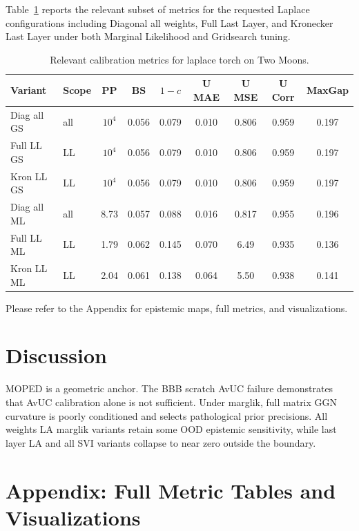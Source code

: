 \documentclass[conference]{IEEEtran}
\begin{document}
Table~\ref{tab:la_main_subset} reports the relevant subset of metrics for the requested Laplace configurations including Diagonal all weights, Full Last Layer, and Kronecker Last Layer under both Marginal Likelihood and Gridsearch tuning.

\begin{table}[H]
	\centering
	\caption{Relevant calibration metrics for laplace torch on Two Moons.}
	\label{tab:la_main_subset}
	\small\setlength{\tabcolsep}{4pt}
	\begin{tabular}{llccccccc}
		\toprule
		Variant     & Scope & PP     & BS    & $1 - c$ & U MAE & U MSE & U Corr & MaxGap \\
		\midrule
		Diag all GS & all   & $10^4$ & 0.056 & 0.079   & 0.010 & 0.806 & 0.959  & 0.197  \\
		Full LL GS  & LL    & $10^4$ & 0.056 & 0.079   & 0.010 & 0.806 & 0.959  & 0.197  \\
		Kron LL GS  & LL    & $10^4$ & 0.056 & 0.079   & 0.010 & 0.806 & 0.959  & 0.197  \\
		Diag all ML & all   & 8.73   & 0.057 & 0.088   & 0.016 & 0.817 & 0.955  & 0.196  \\
		Full LL ML  & LL    & 1.79   & 0.062 & 0.145   & 0.070 & 6.49  & 0.935  & 0.136  \\
		Kron LL ML  & LL    & 2.04   & 0.061 & 0.138   & 0.064 & 5.50  & 0.938  & 0.141  \\
		\bottomrule
	\end{tabular}
\end{table}

Please refer to the Appendix for epistemic maps, full metrics, and visualizations.

\section{Discussion}
\label{sec:discussion}

MOPED is a geometric anchor. The BBB scratch AvUC failure demonstrates that AvUC calibration alone is not sufficient.
Under marglik, full matrix GGN curvature is poorly conditioned and selects pathological prior precisions.
All weights LA marglik variants retain some OOD epistemic sensitivity, while last layer LA and all SVI variants collapse to near zero outside the boundary.

\appendix
\section{Appendix: Full Metric Tables and Visualizations}
\label{sec:app}
\end{document}

